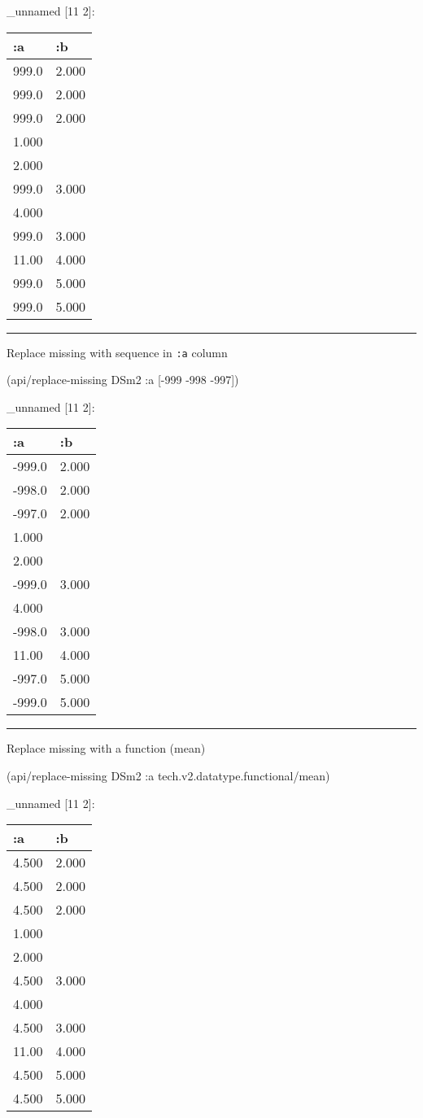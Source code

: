 \documentclass[]{article}
\newenvironment{Shaded}{\begin{snugshade}}{\end{snugshade}}
\newcommand{\DecValTok}[1]{\textcolor[rgb]{0.00,0.00,0.81}{#1}}
\newcommand{\AttributeTok}[1]{\textcolor[rgb]{0.77,0.63,0.00}{#1}}
\newcommand{\NormalTok}[1]{#1}
\begin{document}
\_unnamed {[}11 2{]}:

\begin{longtable}[]{@{}ll@{}}
\toprule
:a & :b\tabularnewline
\midrule
\endhead
999.0 & 2.000\tabularnewline
999.0 & 2.000\tabularnewline
999.0 & 2.000\tabularnewline
1.000 &\tabularnewline
2.000 &\tabularnewline
999.0 & 3.000\tabularnewline
4.000 &\tabularnewline
999.0 & 3.000\tabularnewline
11.00 & 4.000\tabularnewline
999.0 & 5.000\tabularnewline
999.0 & 5.000\tabularnewline
\bottomrule
\end{longtable}

\begin{center}\rule{0.5\linewidth}{0.5pt}\end{center}

Replace missing with sequence in \texttt{:a} column

\begin{Shaded}
\begin{Highlighting}[]
\NormalTok{(api/replace-missing DSm2 }\AttributeTok{:a}\NormalTok{ [-}\DecValTok{999} \DecValTok{-998} \DecValTok{-997}\NormalTok{])}
\end{Highlighting}
\end{Shaded}

\_unnamed {[}11 2{]}:

\begin{longtable}[]{@{}ll@{}}
\toprule
:a & :b\tabularnewline
\midrule
\endhead
-999.0 & 2.000\tabularnewline
-998.0 & 2.000\tabularnewline
-997.0 & 2.000\tabularnewline
1.000 &\tabularnewline
2.000 &\tabularnewline
-999.0 & 3.000\tabularnewline
4.000 &\tabularnewline
-998.0 & 3.000\tabularnewline
11.00 & 4.000\tabularnewline
-997.0 & 5.000\tabularnewline
-999.0 & 5.000\tabularnewline
\bottomrule
\end{longtable}

\begin{center}\rule{0.5\linewidth}{0.5pt}\end{center}

Replace missing with a function (mean)

\begin{Shaded}
\begin{Highlighting}[]
\NormalTok{(api/replace-missing DSm2 }\AttributeTok{:a}\NormalTok{ tech.v2.datatype.functional/mean)}
\end{Highlighting}
\end{Shaded}

\_unnamed {[}11 2{]}:

\begin{longtable}[]{@{}ll@{}}
\toprule
:a & :b\tabularnewline
\midrule
\endhead
4.500 & 2.000\tabularnewline
4.500 & 2.000\tabularnewline
4.500 & 2.000\tabularnewline
1.000 &\tabularnewline
2.000 &\tabularnewline
4.500 & 3.000\tabularnewline
4.000 &\tabularnewline
4.500 & 3.000\tabularnewline
11.00 & 4.000\tabularnewline
4.500 & 5.000\tabularnewline
4.500 & 5.000\tabularnewline
\bottomrule
\end{longtable}
\end{document}
